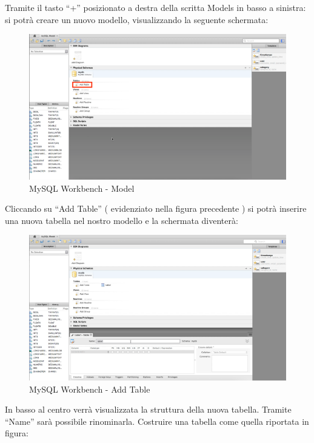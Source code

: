 Tramite il tasto “+” posizionato a destra della scritta Models in basso a sinistra:  
si potrà creare un nuovo modello, visualizzando la seguente schermata:  

\begin{center}
\begin{figure}[H]
\centering
\includegraphics[scale=0.8]{figures/mySQL_workbench_model.png}
\caption{MySQL Workbench - Model}
\end{figure}
\end{center}

Cliccando su “Add Table” ( evidenziato nella figura precedente ) si potrà inserire una nuova tabella nel nostro modello e la schermata diventerà: 

\begin{center}
\begin{figure}[H]
\centering
\includegraphics[scale=0.8]{figures/mySQL_workbench_addtable.png}
\caption{MySQL Workbench - Add Table}
\end{figure}
\end{center}

In basso al centro verrà visualizzata la struttura della nuova tabella. Tramite “Name” sarà possibile rinominarla. Costruire una tabella come quella riportata in figura:  

